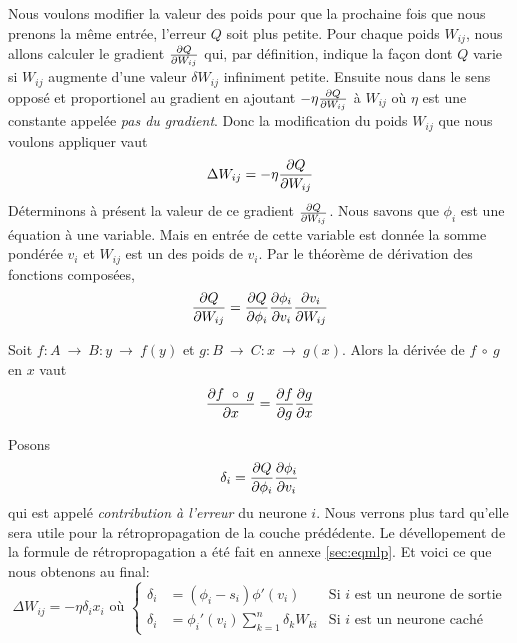 Nous voulons modifier la valeur des poids pour que la prochaine fois que nous prenons la même entrée, l'erreur $Q$ soit plus petite.
Pour chaque poids $W_{ij}$, nous allons calculer le gradient $\frac{\partial Q}{\partial W_{ij}}$ qui, par définition, indique la façon dont $Q$ varie si $W_{ij}$ augmente d'une valeur $\delta W_{ij}$ infiniment petite.
Ensuite nous  dans le sens opposé et proportionel au gradient en ajoutant $-\eta\frac{\partial Q}{\partial W_{ij}}$ à $W_{ij}$ où $\eta$ est une constante appelée \emph{pas du gradient}.
Donc la modification du poids $W_{ij}$ que nous voulons appliquer vaut
\begin{equation}%
 \Delta W_{ij} = -\eta\partiel{Q}{W_{ij}}
\end{equation}
Déterminons à présent la valeur de ce gradient $\frac{\partial Q}{\partial W_{ij}}$.
Nous savons que $\phi_i$ est une équation à une variable.
Mais en entrée de cette variable est donnée la somme pondérée $v_i$ et $W_{ij}$ est un des poids de $v_i$.
Par le théorème de dérivation des fonctions composées,
\begin{equation}%
 \partiel{Q}{W_{ij}} = \partiel{Q}{\phi_i} \partiel{\phi_i}{v_i} \partiel{v_i}{W_{ij}}
\end{equation}
\begin{thm}
Soit $f:A~\rightarrow~B : y~\rightarrow~f(y)$ et $g:B~\rightarrow~C : x~\rightarrow~g(x)$. Alors la dérivée de $f~\circ~g$ en $x$ vaut
\[\frac{\partial f~\circ~g}{\partial x} = \frac{\partial f}{\partial g} \frac{\partial g}{\partial x}\]
\end{thm}
Posons
\begin{equation}%
 \delta_i = \partiel{Q}{\phi_i} \partiel{\phi_i}{v_i}
\end{equation}
qui est appelé \emph{contribution à l'erreur} du neurone $i$.
Nous verrons plus tard qu'elle sera utile pour la rétropropagation de la couche prédédente.
Le dévellopement de la formule de rétropropagation a été fait en annexe \ref{sec:eqmlp}.
Et voici ce que nous obtenons au final:\\
\begin{equation}\label{eq:mlpretro}
 \Delta W_{ij} = -\eta \delta_i x_i \text{~où~}\left\{
  \begin{array}{lll}
   \delta_i & = (\phi_i - s_i)\phi'(v_i) & \text{Si~} i \text{~est un neurone de sortie}\\
   \delta_i & = \phi_i'(v_i) \sum_{k=1}^{n} \delta_k W_{ki} & \text{Si~} i \text{~est un neurone caché}
  \end{array}
 \right.
\end{equation}

